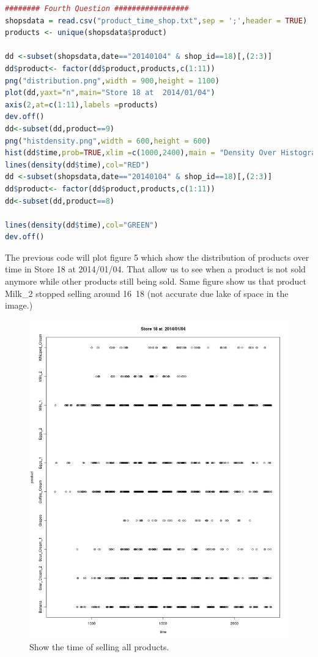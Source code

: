 \documentclass{article}
\begin{document}
\begin{lstlisting}[language=R]
######## Fourth Question #################
shopsdata = read.csv("product_time_shop.txt",sep = ';',header = TRUE)
products <- unique(shopsdata$product)

dd <-subset(shopsdata,date=="20140104" & shop_id==18)[,(2:3)]
dd$product<- factor(dd$product,products,c(1:11))
png("distribution.png",width = 900,height = 1100)
plot(dd,yaxt="n",main="Store 18 at  2014/01/04")
axis(2,at=c(1:11),labels =products)
dev.off()
dd<-subset(dd,product==9)
png("histdensity.png",width = 600,height = 600)
hist(dd$time,prob=TRUE,xlim =c(1000,2400),main = "Density Over Histogram",xlab="Time")
lines(density(dd$time),col="RED")
dd <-subset(shopsdata,date=="20140104" & shop_id==18)[,(2:3)]
dd$product<- factor(dd$product,products,c(1:11))
dd<-subset(dd,product==8)

lines(density(dd$time),col="GREEN")
dev.off()

\end{lstlisting}
The previous code will plot figure 5 which show the distribution of products over time in Store 18 at 2014/01/04. That allow us to see when a product is not sold anymore while other products still being sold.
Same figure show us that product Milk\_2 stopped selling around 16~18 (not accurate due lake of space in the image.) 
\begin{figure}[H]
\begin{center}
	\includegraphics[scale=0.6]{distribution.png}
\end{center}
\caption{Show the time of selling all products.}
\end{figure}
\end{document}
